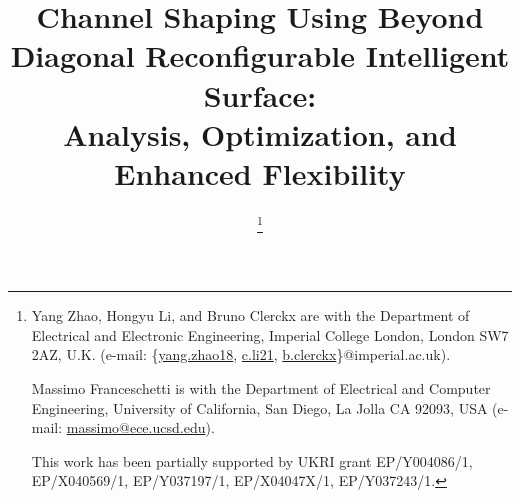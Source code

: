 \documentclass[journal]{IEEEtran}
\begin{document}
\title{Channel Shaping Using Beyond Diagonal Reconfigurable Intelligent Surface:\\Analysis, Optimization, and Enhanced Flexibility}
\author{
	\thanks{
		Yang Zhao, Hongyu Li, and Bruno Clerckx are with the Department of Electrical and Electronic Engineering, Imperial College London, London SW7 2AZ, U.K. (e-mail: \{\href{mailto:yang.zhao18@imperial.ac.uk}{yang.zhao18}, \href{mailto:c.li21@imperial.ac.uk}{c.li21}, \href{mailto:b.clerckx@imperial.ac.uk}{b.clerckx}\}@imperial.ac.uk).

		Massimo Franceschetti is with the Department of Electrical and Computer Engineering, University of California, San Diego, La Jolla CA 92093, USA (e-mail: \href{mailto:massimo@ece.ucsd.edu}{massimo@ece.ucsd.edu}).

		This work has been partially supported by UKRI grant EP/Y004086/1, EP/X040569/1, EP/Y037197/1, EP/X04047X/1, EP/Y037243/1.
	}
}
\maketitle
\end{document}
